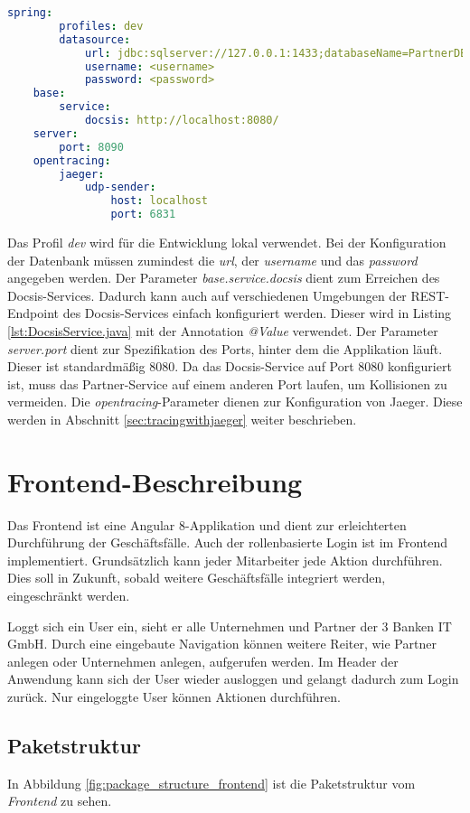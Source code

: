 \begin{lstlisting}[language=yml, caption={application.yml}, label={application.yml.dev}]
	spring:
		profiles: dev
		datasource:
			url: jdbc:sqlserver://127.0.0.1:1433;databaseName=PartnerDB
			username: <username>
			password: <password>
	base:
		service:
			docsis: http://localhost:8080/
	server:
		port: 8090
	opentracing:
		jaeger:
			udp-sender:
				host: localhost
				port: 6831
\end{lstlisting}

Das Profil \textit{dev} wird für die Entwicklung lokal verwendet. Bei der Konfiguration der Datenbank müssen zumindest die \textit{url}, der \textit{username} und das \textit{password} angegeben werden. Der Parameter \textit{base.service.docsis} dient zum Erreichen des Docsis-Services. Dadurch kann auch auf verschiedenen Umgebungen der REST-Endpoint des Docsis-Services einfach konfiguriert werden. Dieser wird in Listing \ref{lst:DocsisService.java} mit der Annotation \textit{@Value} verwendet.
Der Parameter \textit{server.port} dient zur Spezifikation des Ports, hinter dem die Applikation läuft. Dieser ist standardmäßig 8080. Da das Docsis-Service auf Port 8080 konfiguriert ist, muss das Partner-Service auf einem anderen Port laufen, um Kollisionen zu vermeiden.
Die \textit{opentracing}-Parameter dienen zur Konfiguration von Jaeger. Diese werden in Abschnitt \ref{sec:tracingwithjaeger} weiter beschrieben.

\section{Frontend-Beschreibung}
Das Frontend ist eine Angular 8-Applikation und dient zur erleichterten Durchführung der Geschäftsfälle. Auch der rollenbasierte Login ist im Frontend implementiert. Grundsätzlich kann jeder Mitarbeiter jede Aktion durchführen. Dies soll in Zukunft, sobald weitere Geschäftsfälle integriert werden, eingeschränkt werden. 

Loggt sich ein User ein, sieht er alle Unternehmen und Partner der 3 Banken IT GmbH. Durch eine eingebaute Navigation können weitere Reiter, wie Partner anlegen oder Unternehmen anlegen, aufgerufen werden. Im Header der Anwendung kann sich der User wieder ausloggen und gelangt dadurch zum Login zurück. Nur eingeloggte User können Aktionen durchführen.

\subsection{Paketstruktur}
In Abbildung \ref{fig:package_structure_frontend} ist die Paketstruktur vom \textit{Frontend} zu sehen.

